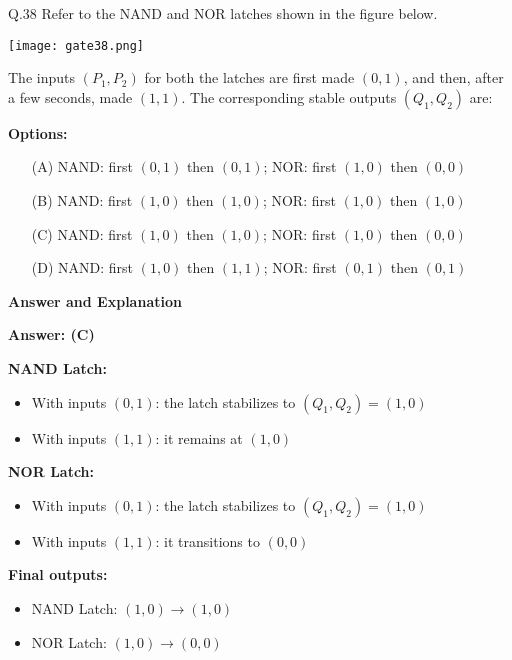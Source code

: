 \documentclass[12pt]{article}
\begin{document}
\noindent
Q.38 Refer to the NAND and NOR latches shown in the figure below.

\begin{center}
    \texttt{[image: gate38.png]} %
\end{center}

\vspace{0.5em}
\noindent
The inputs \((P_1, P_2)\) for both the latches are first made \((0,1)\), and then, after a few seconds, made \((1,1)\). The corresponding stable outputs \((Q_1, Q_2)\) are:

\vspace{0.5em}
\noindent
\textbf{Options:}
\begin{itemize}
    \item[(A)] NAND: first \((0,1)\) then \((0,1)\); \quad NOR: first \((1,0)\) then \((0,0)\)
    \item[(B)] NAND: first \((1,0)\) then \((1,0)\); \quad NOR: first \((1,0)\) then \((1,0)\)
    \item[(C)] NAND: first \((1,0)\) then \((1,0)\); \quad NOR: first \((1,0)\) then \((0,0)\)
    \item[(D)] NAND: first \((1,0)\) then \((1,1)\); \quad NOR: first \((0,1)\) then \((0,1)\)
\end{itemize}

\vspace{1em}
\noindent
{\color{violet}\textbf{Answer and Explanation}}

\vspace{0.5em}
{\color{blue}\textbf{Answer: (C)}}

\vspace{0.5em}
\textbf{NAND Latch:}
\begin{itemize}
    \item With inputs \((0,1)\): the latch stabilizes to \((Q_1, Q_2) = (1,0)\)
    \item With inputs \((1,1)\): it remains at \((1,0)\)
\end{itemize}

\textbf{NOR Latch:}
\begin{itemize}
    \item With inputs \((0,1)\): the latch stabilizes to \((Q_1, Q_2) = (1,0)\)
    \item With inputs \((1,1)\): it transitions to \((0,0)\)
\end{itemize}

\textbf{Final outputs:}
\begin{itemize}
    \item NAND Latch: \((1,0) \rightarrow (1,0)\)
    \item NOR Latch: \((1,0) \rightarrow (0,0)\)
\end{itemize}
\end{document}
